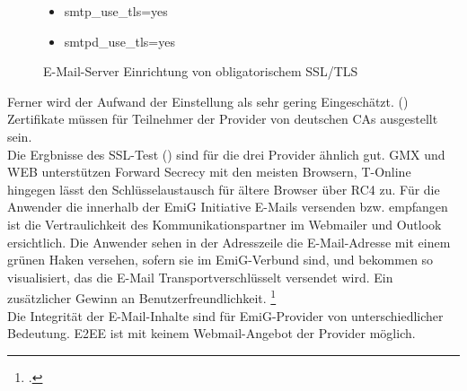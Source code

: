 \documentclass  [paper=a4,
				fontsize=12pt,
				listof=totoc,
				bibliography=totoc
				]{scrreprt}
\begin{document}
			\begin{figure} %
				\vspace{-24pt}
				\centering
				\begin{itemize}
					\renewcommand{\labelitemi}{$\Rightarrow$}
					\item smtp\_use\_tls=yes
					\item smtpd\_use\_tls=yes
				\end{itemize}
				\caption[EmiG: SSL/TLS wurde aktiviert]{E-Mail-Server Einrichtung von obligatorischem SSL/TLS\footnotemark}
				\label{fig:emig_tls} %
				\vspace{-12pt}
			\end{figure}
			Ferner wird der Aufwand der Einstellung als sehr gering Eingeschätzt. ()\\
			Zertifikate müssen für Teilnehmer der Provider von deutschen \acp{CA} ausgestellt sein.\medskip\\
			Die Ergbnisse des SSL-Test () sind für die drei Provider ähnlich gut. GMX und WEB unterstützen Forward Secrecy mit den meisten Browsern, T-Online hingegen lässt den Schlüsselaustausch für ältere Browser über RC4 zu.
			Für die Anwender die innerhalb der EmiG Initiative E-Mails versenden bzw. empfangen ist die Vertraulichkeit des Kommunikationspartner im Webmailer und Outlook ersichtlich.
			Die Anwender sehen in der Adresszeile die E-Mail-Adresse mit einem grünen Haken versehen, sofern sie im EmiG-Verbund sind, und bekommen so visualisiert, das die E-Mail Transportverschlüsselt versendet wird. Ein zusätzlicher Gewinn an Benutzerfreundlichkeit.
			\footcite[Vgl.][]{Zivadino14-1}\medskip\\
			Die Integrität der E-Mail-Inhalte sind für EmiG-Provider von unterschiedlicher Bedeutung.
			\acf{E2EE} ist mit keinem Webmail-Angebot der Provider möglich.
\end{document}
